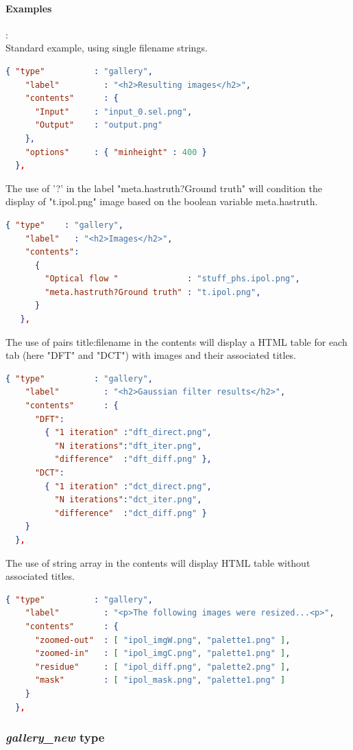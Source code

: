 \paragraph{Examples}:\\
Standard example, using single filename strings.
\begin{lstlisting}[language=json,firstnumber=1]
  { "type"          : "gallery",
    "label"         : "<h2>Resulting images</h2>",
    "contents"      : { 
      "Input"     : "input_0.sel.png", 
      "Output"    : "output.png"
    },
    "options"     : { "minheight" : 400 }
  },
\end{lstlisting}
The use of '?' in the label "meta.hastruth?Ground truth" will condition the 
display of "t.ipol.png" image based on the boolean variable meta.hastruth.
\begin{lstlisting}[language=json,firstnumber=1]
  { "type"    : "gallery",
    "label"   : "<h2>Images</h2>",
    "contents": 
      {
        "Optical flow "              : "stuff_phs.ipol.png", 
        "meta.hastruth?Ground truth" : "t.ipol.png",
      }
   },
\end{lstlisting}
The use of pairs title:filename in the contents will display a HTML table
for each tab (here "DFT" and "DCT") with images and their associated titles.
\begin{lstlisting}[language=json,firstnumber=1]
  { "type"          : "gallery",
    "label"         : "<h2>Gaussian filter results</h2>",
    "contents"      : { 
      "DFT":
        { "1 iteration" :"dft_direct.png", 
          "N iterations":"dft_iter.png", 
          "difference"  :"dft_diff.png" }, 
      "DCT":                     
        { "1 iteration" :"dct_direct.png", 
          "N iterations":"dct_iter.png",
          "difference"  :"dct_diff.png" }
    }
  },
\end{lstlisting}
The use of string array in the contents will display HTML table without associated
titles.
\begin{lstlisting}[language=json,firstnumber=1]
  { "type"          : "gallery",
    "label"         : "<p>The following images were resized...<p>",
    "contents"      : { 
      "zoomed-out"  : [ "ipol_imgW.png", "palette1.png" ],
      "zoomed-in"   : [ "ipol_imgC.png", "palette1.png" ],
      "residue"     : [ "ipol_diff.png", "palette2.png" ],
      "mask"        : [ "ipol_mask.png", "palette1.png" ]
    }
  },
\end{lstlisting}

\subsubsection{ \emph{gallery\_new} type}

